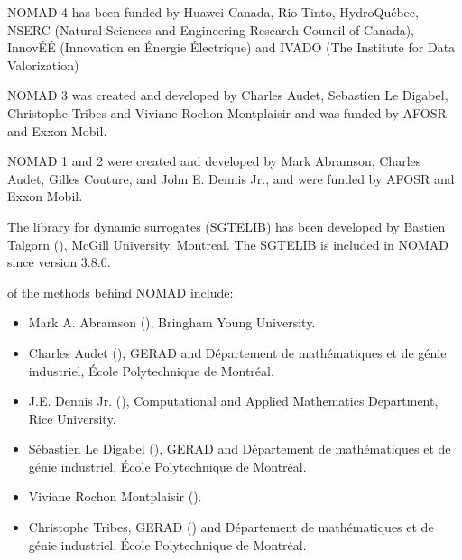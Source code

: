 \documentclass[letterpaper,10pt,english]{sphinxmanual}
\begin{document}
\sphinxAtStartPar
NOMAD 4 has been funded by Huawei Canada, Rio Tinto, Hydro\sphinxhyphen{}Québec, NSERC (Natural Sciences and Engineering Research Council of Canada), InnovÉÉ (Innovation en Énergie Électrique) and IVADO (The Institute for Data Valorization)

\sphinxAtStartPar
NOMAD 3 was created and developed by Charles Audet, Sebastien Le Digabel, Christophe Tribes and Viviane Rochon Montplaisir and was funded by AFOSR and Exxon Mobil.

\sphinxAtStartPar
NOMAD 1 and 2 were created and developed by Mark Abramson, Charles Audet, Gilles Couture, and John E. Dennis Jr., and were funded by AFOSR and Exxon Mobil.

\sphinxAtStartPar
The library for dynamic surrogates (SGTELIB) has been developed by Bastien Talgorn (), McGill University, Montreal.
The SGTELIB is included in NOMAD since version 3.8.0.

\sphinxAtStartPar
{} of the methods behind NOMAD include:
\begin{itemize}
\item {} 
\sphinxAtStartPar
Mark A. Abramson (), Bringham Young University.

\item {} 
\sphinxAtStartPar
Charles Audet (), GERAD and Département de mathématiques et de génie industriel, École Polytechnique de Montréal.

\item {} 
\sphinxAtStartPar
J.E. Dennis Jr. (), Computational and Applied Mathematics Department, Rice University.

\item {} 
\sphinxAtStartPar
Sébastien Le Digabel (), GERAD and Département de mathématiques et de génie industriel, École Polytechnique de Montréal.

\item {} 
\sphinxAtStartPar
Viviane Rochon Montplaisir ().

\item {} 
\sphinxAtStartPar
Christophe Tribes, GERAD () and Département de mathématiques et de génie industriel, École Polytechnique de Montréal.

\end{itemize}
\end{document}
